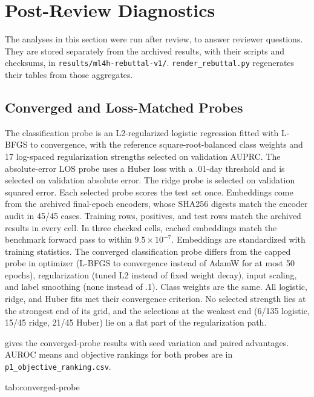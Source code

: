 \section{Post-Review Diagnostics}
\label{app:post-review}

The analyses in this section were run after review, to answer reviewer questions. They are stored separately from the archived results, with their scripts and checksums, in \texttt{results/ml4h-rebuttal-v1/}. \texttt{render\_rebuttal.py} regenerates their tables from those aggregates.

\subsection{Converged and Loss-Matched Probes}
\label{app:converged}

The classification probe is an L2-regularized logistic regression fitted with L-BFGS to convergence, with the reference square-root-balanced class weights and 17 log-spaced regularization strengths selected on validation AUPRC. The absolute-error LOS probe uses a Huber loss with a .01-day threshold and is selected on validation absolute error. The ridge probe is selected on validation squared error. Each selected probe scores the test set once. Embeddings come from the archived final-epoch encoders, whose SHA256 digests match the encoder audit in 45/45 cases. Training rows, positives, and test rows match the archived results in every cell. In three checked cells, cached embeddings match the benchmark forward pass to within $9.5\times10^{-7}$. Embeddings are standardized with training statistics. The converged classification probe differs from the capped probe in optimizer (L-BFGS to convergence instead of AdamW for at most 50 epochs), regularization (tuned L2 instead of fixed weight decay), input scaling, and label smoothing (none instead of .1). Class weights are the same. All logistic, ridge, and Huber fits met their convergence criterion. No selected strength lies at the strongest end of its grid, and the selections at the weakest end (6/135 logistic, 15/45 ridge, 21/45 Huber) lie on a flat part of the regularization path.

 gives the converged-probe results with seed variation and paired advantages. AUROC means and objective rankings for both probes are in \texttt{p1\_objective\_ranking.csv}.

\begin{table}[htbp]
\floatconts
  {tab:converged-probe}
  {\caption{Converged frozen probe. Test AUPRC, mean (sample SD) over five seeds, on the same frozen embeddings as the capped probe. $\Delta$ is the mean paired difference between \MAE{} and the stronger alternative, for the converged (conv.) and capped (cap.) probe. Bold marks the highest mean.}}
  {\scriptsize
  }
\end{table}

